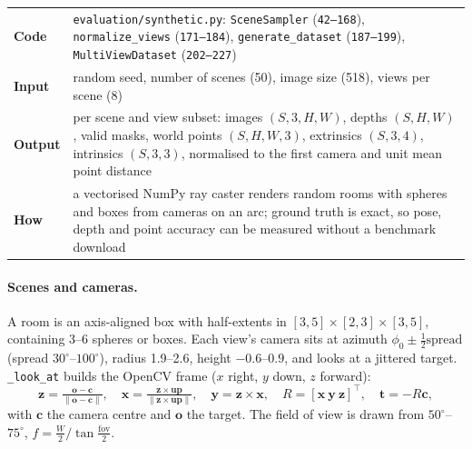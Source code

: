 \documentclass[11pt,a4paper]{article}
\makeatletter
\newcommand{\src}[1]{\texttt{\small #1}}
\newenvironment{card}[1]{%
  \begin{tcolorbox}[enhanced,colback=aa!3,colframe=aa!65!black,fonttitle=\bfseries\small,title={#1},
    left=4pt,right=4pt,top=3pt,bottom=3pt,boxrule=0.6pt,arc=2pt]\small
  \begin{tabular}{@{}>{\bfseries}p{1.7cm}p{\dimexpr\linewidth-1.7cm-2\tabcolsep\relax}@{}}}%
  {\end{tabular}\end{tcolorbox}}
\makeatother
\begin{document}
\begin{card}{Phase 9 at a glance}
Code & \src{evaluation/synthetic.py}: \texttt{SceneSampler} (\src{42--168}), \texttt{normalize\_views} (\src{171--184}),
\texttt{generate\_dataset} (\src{187--199}), \texttt{MultiViewDataset} (\src{202--227}) \\
Input & random seed, number of scenes (50), image size (518), views per scene (8) \\
Output & per scene and view subset: images $(S,3,H,W)$, depths $(S,H,W)$, valid masks, world points $(S,H,W,3)$, extrinsics
$(S,3,4)$, intrinsics $(S,3,3)$, normalised to the first camera and unit mean point distance \\
How & a vectorised NumPy ray caster renders random rooms with spheres and boxes from cameras on an arc; ground truth is
exact, so pose, depth and point accuracy can be measured without a benchmark download \\
\end{card}

\paragraph{Scenes and cameras.} A room is an axis-aligned box with half-extents in $[3,5]\times[2,3]\times[3,5]$, containing
3--6 spheres or boxes. Each view's camera sits at azimuth $\phi_0 \pm \tfrac12\text{spread}$ (spread $30^\circ$--$100^\circ$),
radius 1.9--2.6, height $-0.6$--$0.9$, and looks at a jittered target. \texttt{\_look\_at} builds the OpenCV frame
($x$ right, $y$ down, $z$ forward):
\[
  \mathbf{z} = \tfrac{\mathbf{o}-\mathbf{c}}{\|\mathbf{o}-\mathbf{c}\|},\quad
  \mathbf{x} = \tfrac{\mathbf{z}\times\mathbf{up}}{\|\mathbf{z}\times\mathbf{up}\|},\quad
  \mathbf{y} = \mathbf{z}\times\mathbf{x},\quad R = [\mathbf{x}\ \mathbf{y}\ \mathbf{z}]^\top,\quad \mathbf{t} = -R\mathbf{c},
\]
with $\mathbf{c}$ the camera centre and $\mathbf{o}$ the target. The field of view is drawn from $50^\circ$--$75^\circ$,
$f = \tfrac{W}{2}/\tan\tfrac{\text{fov}}{2}$.
\end{document}
